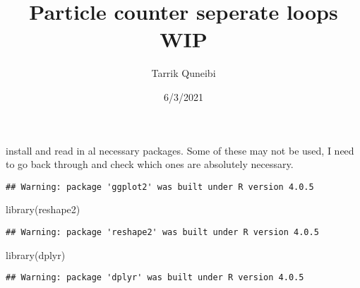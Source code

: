 \documentclass[
]{article}
\title{Particle counter seperate loops WIP}
\author{Tarrik Quneibi}
\date{6/3/2021}
\newenvironment{Shaded}{\begin{snugshade}}{\end{snugshade}}
\newcommand{\AttributeTok}[1]{\textcolor[rgb]{0.77,0.63,0.00}{#1}}
\newcommand{\ConstantTok}[1]{\textcolor[rgb]{0.00,0.00,0.00}{#1}}
\newcommand{\DocumentationTok}[1]{\textcolor[rgb]{0.56,0.35,0.01}{\textbf{\textit{#1}}}}
\newcommand{\FunctionTok}[1]{\textcolor[rgb]{0.00,0.00,0.00}{#1}}
\newcommand{\NormalTok}[1]{#1}
\newcommand{\SpecialCharTok}[1]{\textcolor[rgb]{0.00,0.00,0.00}{#1}}
\begin{document}
\maketitle

install and read in al necessary packages. Some of these may not be
used, I need to go back through and check which ones are absolutely
necessary.

\begin{Shaded}
\end{Shaded}

\begin{verbatim}
## Warning: package 'ggplot2' was built under R version 4.0.5
\end{verbatim}

\begin{Shaded}
\begin{Highlighting}[]
\FunctionTok{library}\NormalTok{(reshape2)}
\end{Highlighting}
\end{Shaded}

\begin{verbatim}
## Warning: package 'reshape2' was built under R version 4.0.5
\end{verbatim}

\begin{Shaded}
\begin{Highlighting}[]
\FunctionTok{library}\NormalTok{(dplyr)}
\end{Highlighting}
\end{Shaded}

\begin{verbatim}
## Warning: package 'dplyr' was built under R version 4.0.5
\end{verbatim}
\end{document}
